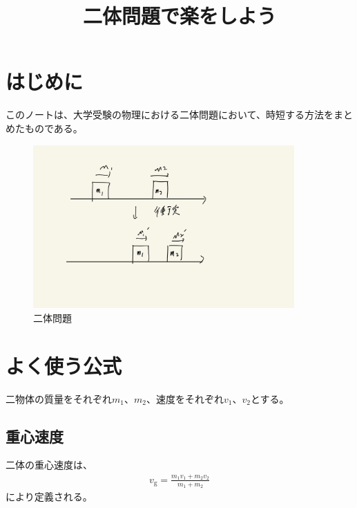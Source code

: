 \documentclass[a4paper,11pt]{jsarticle}
\numberwithin{equation}{section}
\begin{document}
\title{二体問題で楽をしよう}
\maketitle

\section{はじめに}
このノートは、大学受験の物理における二体問題において、時短する方法をまとめたものである。

\begin{figure}[H]
    \begin{center}
    \includegraphics[width=100mm]{qq.jpg}
    \end{center}
    \caption{二体問題}
    \label{fig:o1}
\end{figure}

\section{よく使う公式}
二物体の質量をそれぞれ$m_1$、$m_2$、速度をそれぞれ$v_1$、$v_2$とする。

\subsection{重心速度}
二体の重心速度は、
\begin{align}
    v_{\text{g}} = \frac{m_1v_1 + m_2v_2}{m_1 + m_2}
\end{align}
により定義される。
\end{document}
